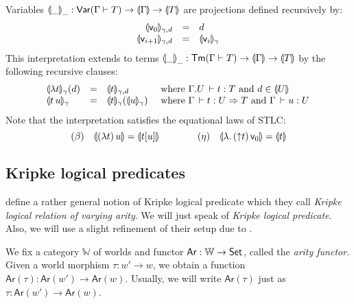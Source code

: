 \documentclass[a4paper]{article}
\newcommand{\wk}{\mathord{\uparrow}}
\newcommand{\WW}{\mathbb{W}}
\newcommand{\tAr}{\mathsf{Ar}}
\newcommand{\Ar}[1]{\tAr(#1)}
\begin{document}
Variables $\llparenthesis\_\rrparenthesis_{\_} : \mathsf{Var}(\Gamma \vdash T) \to \llparenthesis\Gamma\rrparenthesis \to \llparenthesis T\rrparenthesis$
are projections defined recursively by:
\[
\begin{array}{rlll}
  \llparenthesis\mathsf{v}_{0}\rrparenthesis_{\gamma,d} & = & d \\
  \llparenthesis\mathsf{v}_{i+1}\rrparenthesis_{\gamma,d} & = & \llparenthesis\mathsf{v}_{i}\rrparenthesis_{\gamma} \\
\end{array}
\]
This interpretation extends to terms
$\llparenthesis\_\rrparenthesis_{\_} : \mathsf{Tm}(\Gamma \vdash T) \to \llparenthesis\Gamma\rrparenthesis \to \llparenthesis T\rrparenthesis$
by the following recursive clauses:
\[
\begin{array}{llll}
  \llparenthesis\lambda t\rrparenthesis_{\gamma}(d) & = & \llparenthesis t\rrparenthesis_{\gamma,d}
   & \ \mbox{where}\  \Gamma.U \,\vdash t : T
     \ \mbox{and}\  d \in \llparenthesis U\rrparenthesis \\
  \llparenthesis t\,u\rrparenthesis_{\gamma} & = & \llparenthesis t\rrparenthesis_{\gamma} (\llparenthesis u\rrparenthesis_{\gamma})
   & \ \mbox{where}\  \Gamma \,\vdash t : U \Rightarrow T \ \mbox{and}\  \Gamma \,\vdash u : U \\
\end{array}
\]
Note that the interpretation satisfies the equational laws of STLC:
\[
  (\beta)\quad
  \denty{(\lambda t)\,u} = \denty{t[u]}
\qquad\qquad
  (\eta)\quad
  \denty{\lambda.\,(\wk t)\,\ind 0} = \denty t
\]

\subsection{Kripke logical predicates}

\cite{jungTiuryn:tlca93} define a rather general notion of Kripke
logical predicate which they call \emph{Kripke logical relation of
  varying arity}.
We will just speak of \emph{Kripke logical predicate}.
Also, we will use a slight refinement of
their setup due to \cite{fioreSimpson:tlca99}.

We fix a category $\WW$ of worlds and functor $\tAr : \WW \to \Set$,
called the \emph{arity functor}.
Given a world morphism $\tau : w' \to w$, we obtain a function
$\Ar \tau : \Ar{w'} \to \Ar{w}$.  Usually, we will write $\Ar\tau$
just as $\tau : \Ar{w'} \to \Ar{w}$.
\end{document}
